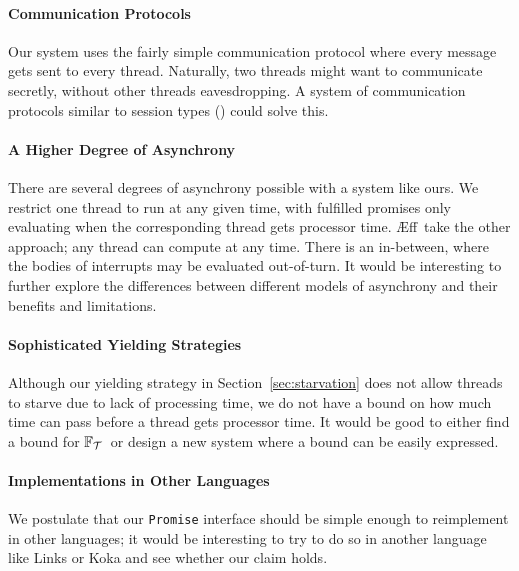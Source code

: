 \documentclass[msc,deptreport,cs]{infthesis} %
\newcommand{\code}[1]{\lstinline{#1}}
\newcommand\aeff{{\AE}ff\xspace}
\newcommand\treefrank{$\mathbb{F}_{\cal{T}}$}
\newcommand\yield{\textsf{yield}\xspace}
\begin{document}
\paragraph*{Communication Protocols}
Our system uses the fairly simple communication protocol where every message
gets sent to every thread. Naturally, two threads might want to communicate
secretly, without other threads eavesdropping. A system of communication
protocols similar to session types (\cite{honda1998language}) could solve this.

\paragraph*{A Higher Degree of Asynchrony}
There are several degrees of asynchrony possible with a system like ours. We
restrict one thread to run at any given time, with fulfilled promises only
evaluating when the corresponding thread gets processor time. \aeff~take the
other approach; any thread can compute at any time. There is an in-between,
where the bodies of interrupts may be evaluated out-of-turn. It would be
interesting to further explore the differences between different models of
asynchrony and their benefits and limitations.

\paragraph*{Sophisticated Yielding Strategies}
Although our \yield{}ing strategy in Section~\ref{sec:starvation} does not allow
threads to starve due to lack of processing time, we do not have a bound on how
much time can pass before a thread gets processor time. It would be good to
either find a bound for \treefrank~or design a new system where a bound can be
easily expressed.

\paragraph*{Implementations in Other Languages}
We postulate that our \code{Promise} interface should be simple enough to
reimplement in other languages; it would be interesting to try to do so in
another language like Links or Koka and see whether our claim holds.





\end{document}
